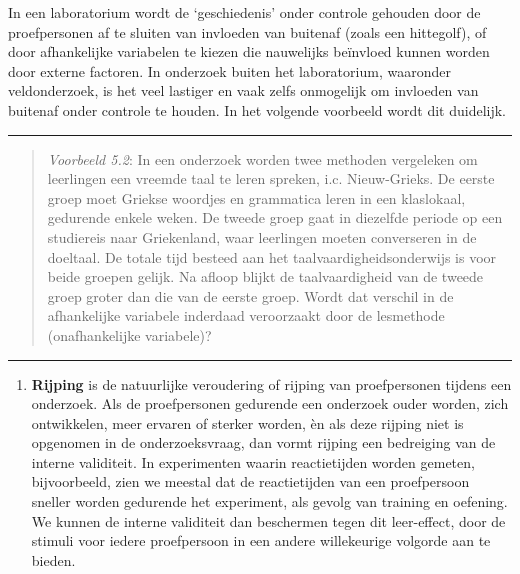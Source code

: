 \documentclass[
]{book}
\providecommand{\tightlist}{%
  \setlength{\itemsep}{0pt}\setlength{\parskip}{0pt}}
\begin{document}
In een laboratorium wordt de `geschiedenis' onder controle gehouden door
de proefpersonen af te sluiten van invloeden van buitenaf (zoals een
hittegolf), of door afhankelijke variabelen te kiezen die nauwelijks
beïnvloed kunnen worden door externe factoren. In onderzoek buiten het
laboratorium, waaronder veldonderzoek, is het veel lastiger en vaak
zelfs onmogelijk om invloeden van buitenaf onder controle te houden. In
het volgende voorbeeld wordt dit duidelijk.

\begin{center}\rule{0.5\linewidth}{0.5pt}\end{center}

\begin{quote}
\emph{Voorbeeld 5.2}: In een onderzoek worden twee methoden vergeleken om leerlingen een
vreemde taal te leren spreken, i.c. Nieuw-Grieks. De eerste groep moet
Griekse woordjes en grammatica leren in een klaslokaal, gedurende enkele
weken. De tweede groep gaat in diezelfde periode op een studiereis naar
Griekenland, waar leerlingen moeten converseren in de doeltaal. De
totale tijd besteed aan het taalvaardigheidsonderwijs is voor beide
groepen gelijk. Na afloop blijkt de taalvaardigheid van de tweede groep
groter dan die van de eerste groep. Wordt dat verschil in de
afhankelijke variabele inderdaad veroorzaakt door de lesmethode
(onafhankelijke variabele)?
\end{quote}

\begin{center}\rule{0.5\linewidth}{0.5pt}\end{center}

\begin{enumerate}
\def\labelenumi{\arabic{enumi}.}
\setcounter{enumi}{1}
\tightlist
\item
  \textbf{Rijping} is de natuurlijke veroudering of rijping van proefpersonen
  tijdens een onderzoek. Als de proefpersonen gedurende een onderzoek
  ouder worden, zich ontwikkelen, meer ervaren of sterker worden, èn als
  deze rijping niet is opgenomen in de onderzoeksvraag, dan vormt rijping
  een bedreiging van de interne validiteit. In experimenten waarin
  reactietijden worden gemeten, bijvoorbeeld, zien we meestal dat de
  reactietijden van een proefpersoon sneller worden gedurende het
  experiment, als gevolg van training en oefening. We kunnen de interne
  validiteit dan beschermen tegen dit leer-effect, door de stimuli voor
  iedere proefpersoon in een andere willekeurige volgorde aan te bieden.
\end{enumerate}
\end{document}
